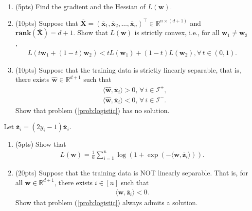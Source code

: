 \documentclass[11pt,letter,notitlepage]{article}
\newcommand{\rank}[1]{ \textbf{rank}  (#1)  }
\begin{document}
\begin{exercise}
    \begin{enumerate}
    	\item (5pts) Find the gradient and the Hessian of $L(\textbf{w})$.
    	\item (10pts) Suppose that $\overline{\textbf{X}}=(\overline{\mathbf{x}}_1,\overline{\mathbf{x}}_2,\dots,\overline{\mathbf{x}}_n)^\top\in\mathbb{R}^{n \times (d+1)}$ and $\rank{\overline{\mathbf{X}}}=d+1$. Show that $L(\textbf{w})$ is strictly convex, i.e., for all $\textbf{w}_1\neq \textbf{w}_2$,
    	\begin{align*}
    	    L(t\textbf{w}_1 + (1-t)\textbf{w}_2) < t L(\textbf{w}_1)+(1-t)L(\textbf{w}_2),\forall\, t \in (0,1).
    	\end{align*}
    	\item (10pts) Suppose that the training data is strictly linearly separable, that is, there exists $\hat{\mathbf{w}}\in\mathbb{R}^{d+1}$ such that
    	\begin{align*}
    	    &\langle \hat{\mathbf{w}}, \mathbf{\bar{x}}_i\rangle>0,\,\forall\,i\in\mathcal{I}^+,\\
    	    &\langle \hat{\mathbf{w}}, \mathbf{\bar{x}}_i\rangle<0,\,\forall\,i\in\mathcal{I}^-.
    	\end{align*}
    	Show that problem (\ref{prob:logistic}) has no solution.
    \end{enumerate}
	Let $\overline{\mathbf{z}}_i = (2 y_i-1)\overline{\mathbf{x}}_i$. 
    \begin{enumerate}[resume]
        \item (5pts) Show that
        \begin{align*}
            L(\textbf{w}) = \frac{1}{n} \sum_{i=1}^n \log(1+\exp(-\langle \mathbf{w},\overline{\mathbf{z}}_i \rangle)).
        \end{align*}
    	\item (20pts) Suppose that the training data is NOT linearly separable. That is, for all $\mathbf{w} \in \mathbb{R}^{d+1}$, there exists $ i \in \left[ n \right] $ such that
    	\begin{align*}
    	    \langle \mathbf{w}, \mathbf{\bar{z}}_i\rangle<0.
    	\end{align*}
    	Show that problem (\ref{prob:logistic}) always admits a solution.
    \end{enumerate}
\end{exercise}

\begin{solution}

\end{solution}
\end{document}

